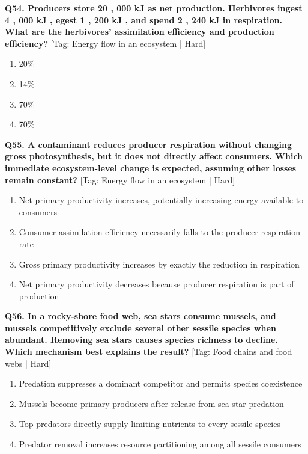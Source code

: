 \noindent\textbf{Q54. Producers store 20 , 000 kJ as net production. Herbivores ingest 4 , 000 kJ , egest 1 , 200 kJ , and spend 2 , 240 kJ in respiration. What are the herbivores' assimilation efficiency and production efficiency?} \hfill [Tag: Energy flow in an ecosystem | Hard]
\begin{enumerate}[label=(\alph*),topsep=2pt,itemsep=1pt,partopsep=0pt,parsep=0pt]
    \item {20\%}
    \item {14\%}
    \item {70\%}
    \item {70\%}
\end{enumerate}
\vspace{2mm}

\noindent\textbf{Q55. A contaminant reduces producer respiration without changing gross photosynthesis, but it does not directly affect consumers. Which immediate ecosystem-level change is expected, assuming other losses remain constant?} \hfill [Tag: Energy flow in an ecosystem | Hard]
\begin{enumerate}[label=(\alph*),topsep=2pt,itemsep=1pt,partopsep=0pt,parsep=0pt]
    \item {Net primary productivity increases, potentially increasing energy available to consumers}
    \item {Consumer assimilation efficiency necessarily falls to the producer respiration rate}
    \item {Gross primary productivity increases by exactly the reduction in respiration}
    \item {Net primary productivity decreases because producer respiration is part of production}
\end{enumerate}
\vspace{2mm}

\noindent\textbf{Q56. In a rocky-shore food web, sea stars consume mussels, and mussels competitively exclude several other sessile species when abundant. Removing sea stars causes species richness to decline. Which mechanism best explains the result?} \hfill [Tag: Food chains and food webs | Hard]
\begin{enumerate}[label=(\alph*),topsep=2pt,itemsep=1pt,partopsep=0pt,parsep=0pt]
    \item {Predation suppresses a dominant competitor and permits species coexistence}
    \item {Mussels become primary producers after release from sea-star predation}
    \item {Top predators directly supply limiting nutrients to every sessile species}
    \item {Predator removal increases resource partitioning among all sessile consumers}
\end{enumerate}
\vspace{2mm}

